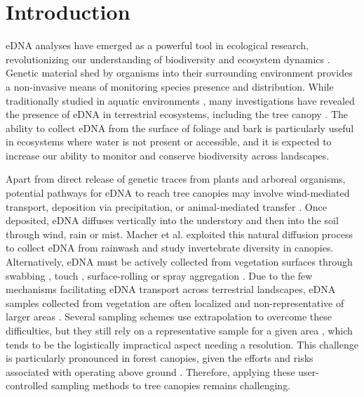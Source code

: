 \section{Introduction}
\label{sec:intro}
%
\Gls{eDNA} analyses have emerged as a powerful tool in ecological research, revolutionizing our understanding of biodiversity and ecosystem dynamics \cite{deiner-2017, beng-2020}. Genetic material shed by organisms into their surrounding environment provides a non-invasive means of monitoring species presence and distribution. While traditionally studied in aquatic environments \cite{deiner-2017, lyet-2020, tsuji-2019}, many investigations have revealed the presence of \gls{eDNA} in terrestrial ecosystems, including the tree canopy \cite{valentin-2020, banerjee-2022, eDrone, macher-2023, allen-using-2023}. The ability to collect \gls{eDNA} from the surface of foliage and bark is particularly useful in ecosystems where water is not present or accessible, and it is expected to increase our ability to monitor and conserve biodiversity across landscapes.

Apart from direct release of genetic traces from plants and arboreal organisms, potential pathways for \gls{eDNA} to reach tree canopies may involve wind-mediated transport, deposition via precipitation, or animal-mediated transfer \cite{valentin-2021, lynggaard-2023}. Once deposited, \gls{eDNA} diffuses vertically into the understory and then into the soil through wind, rain or mist. Macher et al.\cite{macher-2023} exploited this natural diffusion process to collect \gls{eDNA} from rainwash and study invertebrate diversity in canopies. Alternatively, \gls{eDNA} must be actively collected from vegetation surfaces through swabbing \cite{lynggaard-2023}, touch \cite{eDrone}, surface-rolling \cite{valentin-2020, kyle-2022, peterson-2022, allen-sampling-2023} or spray aggregation \cite{valentin-2020, allen-2021}. Due to the few mechanisms facilitating \gls{eDNA} transport across terrestrial landscapes, \gls{eDNA} samples collected from vegetation are often localized and non-representative of larger areas \cite{valentin-2020, roger-2022}. Several sampling schemes use extrapolation to overcome these difficulties, but they still rely on a representative sample for a given area \cite{altermatt-2023}, which tends to be the logistically impractical aspect needing a resolution. This challenge is particularly pronounced in forest canopies, given the efforts and risks associated with operating above ground \cite{Nakamura2017, lowman-2012}. Therefore, applying these user-controlled sampling methods to tree canopies remains challenging. 

